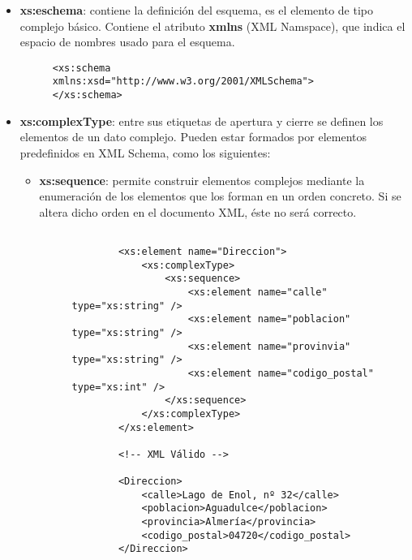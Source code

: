 \begin{itemize}
    \item \textbf{xs:eschema}: contiene la definición del esquema, es el elemento de tipo complejo básico. Contiene el atributo \textbf{xmlns} (XML Namspace), que indica el espacio de nombres usado para el esquema.

    \begin{figure}[h]
        \begin{tcolorbox}[sharp corners, colback=yellow!30, colframe=white!20]
            \scriptsize
            \begin{verbatim}
<xs:schema xmlns:xsd="http://www.w3.org/2001/XMLSchema">
</xs:schema>
            \end{verbatim}
        \end{tcolorbox}
    \end{figure}

    \item \textbf{xs:complexType}: entre sus etiquetas de apertura y cierre se definen los elementos de un dato complejo. Pueden estar formados por elementos predefinidos en XML Schema, como los siguientes:

    \begin{itemize}
        \item \textbf{xs:sequence}: permite construir elementos complejos mediante la enumeración de los elementos que los forman en un orden concreto. Si se altera dicho orden en el documento XML, éste no será correcto.

        \begin{figure}[h]
            \begin{tcolorbox}[sharp corners, colback=yellow!30, colframe=white!20]
                \scriptsize
                \begin{verbatim}

        <xs:element name="Direccion">
            <xs:complexType>
                <xs:sequence>
                    <xs:element name="calle" type="xs:string" />
                    <xs:element name="poblacion" type="xs:string" />
                    <xs:element name="provinvia" type="xs:string" />
                    <xs:element name="codigo_postal" type="xs:int" />
                </xs:sequence>
            </xs:complexType>
        </xs:element>

        <!-- XML Válido -->

        <Direccion>
            <calle>Lago de Enol, nº 32</calle>
            <poblacion>Aguadulce</poblacion>
            <provincia>Almería</provincia>
            <codigo_postal>04720</codigo_postal>
        </Direccion>
               \end{verbatim}
           \end{tcolorbox}
       \end{figure}


\end{itemize}
\end{itemize}
